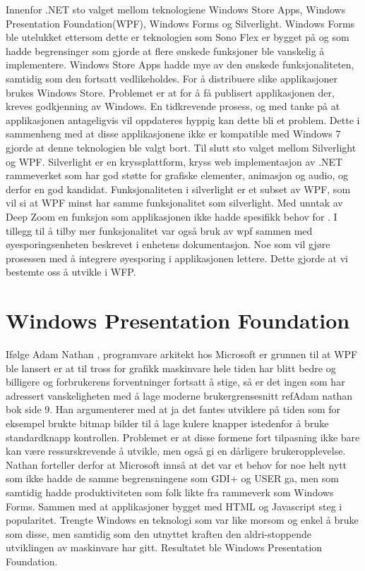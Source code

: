  
Innenfor .NET sto valget mellom teknologiene Windows Store Apps, Windows Presentation Foundation(\gls{WPF}), Windows Forms og Silverlight.  Windows Forms ble utelukket ettersom dette er teknologien som Sono Flex er bygget på og som hadde begrensinger som gjorde at flere ønskede funksjoner ble vanskelig å implementere. Windows Store Apps hadde mye av den ønskede funksjonaliteten, samtidig som den fortsatt vedlikeholdes. For å distribuere slike applikasjoner brukes Windows Store. Problemet er at for å få publisert applikasjonen der, kreves godkjenning av Windows. En tidkrevende prosess, og med tanke på at applikasjonen antageligvis vil oppdateres hyppig kan dette bli et problem. Dette i sammenheng med at disse applikasjonene ikke er kompatible med Windows 7\cite{Windo0:online} gjorde at denne teknologien ble valgt bort. Til slutt sto valget mellom Silverlight og WPF. Silverlight er en kryssplattform, kryss web implementasjon av .NET rammeverket som har god støtte for grafiske elementer, animasjon og audio, og derfor en god kandidat. Funksjonaliteten i silverlight er et subset av WPF, som vil si at WPF minst har samme funksjonalitet som silverlight. Med unntak av Deep Zoom en funksjon som applikasjonen ikke hadde spesifikk behov for \cite{WPFvsSilverlight:online}. I tillegg til å tilby mer funksjonalitet var også bruk av wpf sammen med øyesporingsenheten beskrevet i enhetens dokumentasjon. Noe som vil gjøre prosessen med å integrere øyesporing i applikasjonen lettere. Dette gjorde at vi bestemte oss å utvikle i WFP. 
 
 
\section{Windows Presentation Foundation} 
 
 
Ifølge Adam Nathan \cite[p.~9]{WPFbook}, programvare arkitekt hos Microsoft er grunnen til at WPF ble lansert er at til tross for grafikk maskinvare hele tiden har blitt bedre og billigere og  forbrukerens forventninger fortsatt å stige, så er det ingen som har adressert vanskeligheten med å lage moderne brukergrensesnitt ref{Adam nathan bok side 9}.  Han argumenterer med at ja det fantes utviklere på tiden som for eksempel brukte bitmap bilder til å lage kulere knapper istedenfor å bruke standardknapp kontrollen. Problemet er at disse formene fort tilpasning ikke bare kan være ressurskrevende å utvikle, men også gi en dårligere brukeropplevelse. Nathan forteller derfor at Microsoft innså at det var et behov for noe helt nytt som ikke hadde de samme begrensningene som GDI+ og USER ga, men som samtidig hadde produktiviteten som folk likte fra rammeverk som Windows Forms. Sammen med at applikasjoner bygget med HTML og Javascript steg i popularitet. Trengte Windows en teknologi som var like morsom og enkel å bruke som disse, men samtidig som den utnyttet kraften den aldri-stoppende utviklingen av maskinvare har gitt. Resultatet ble Windows Presentation Foundation. 
 
